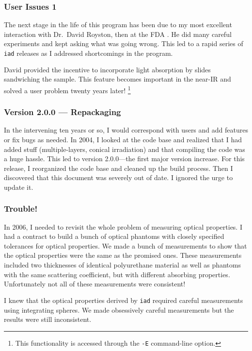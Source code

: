 \documentclass{article}
\newcommand\iadprog{\texttt{iad}}
\begin{document}
\subsubsection*{User Issues 1}

The next stage in the life of this program has been due to my most excellent
interaction with Dr.\ David Royston, then at the FDA \cite{royston96}.  He did many careful experiments and kept asking what was going wrong.  This led to a rapid series of \iadprog{}
releases as I addressed shortcomings in the program.

David provided the incentive to incorporate light absorption by slides sandwiching the sample.
This feature becomes important in the near-IR and solved a user problem twenty years later!%
\footnote{This functionality is accessed through the \texttt{-E} command-line option.}

\subsubsection*{Version 2.0.0 --- Repackaging}

In the intervening ten years or so, I would correspond with users and add
features or fix bugs as needed.  In 2004, I looked at the code base and realized that I had added
stuff (multiple-layers, conical irradiation) and that 
compiling the code was a huge hassle.  This led to version 2.0.0---the first major version increase.  For this release, I reorganized the code
base and cleaned up the build process.  Then I discovered that this document was
severely out of date.  I ignored the urge to update it.

\subsubsection*{Trouble!}

In 2006, I needed to revisit the whole problem of measuring optical
properties.  I had a contract to build a bunch of optical phantoms with closely
specified tolerances for optical properties.  We made a bunch of measurements
to show that the optical properties were the same as the promised ones.  These measurements 
included two thicknesses of identical polyurethane material as well as phantoms with the
same scattering coefficient, but with different absorbing properties.  Unfortunately
not all of these measurements were consistent!

I knew that the optical properties derived by \iadprog{} required careful measurements
using integrating spheres.  We made obsessively careful measurements but the results were still
inconsistent.  
\end{document}
